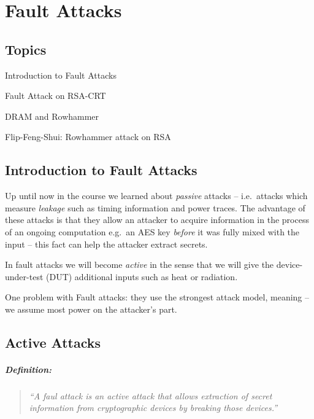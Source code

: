 \newcommand{\Mod}[1]{\ (\mathrm{mod}\ #1)}
\chapter{Fault Attacks}\label{cha:c9_ninthchapter}

\begin{centering}
	\section*{Topics}\label{sec:topics}
		\begin{enumerate}
		\end{enumerate}
\end{centering}
\newpage

\section*{Introduction to Fault Attacks}\label{sec:introduction_to_fault_attacks}
Up until now in the course we learned about \emph{passive} attacks -- i.e.\
attacks which measure \emph{leakage} such as timing information and power
traces. The advantage of these attacks is that they allow an attacker to acquire
information in the process of an ongoing computation e.g.\ an AES key
\emph{before} it was fully mixed with the input -- this fact can help the
attacker extract secrets.

In fault attacks we will become \emph{active} in the sense that we will give the
device-under-test (DUT) additional inputs such as heat or radiation.

One problem with Fault attacks: they use the strongest attack model, meaning --
we assume most power on the attacker's part.

\section{Active Attacks}\label{sec:active_attacks}
\paragraph{Definition:}
\begin{quote}
	\textit{``A faul attack is an active attack that allows extraction of secret information from cryptographic devices by breaking those devices.''}
\end{quote}

